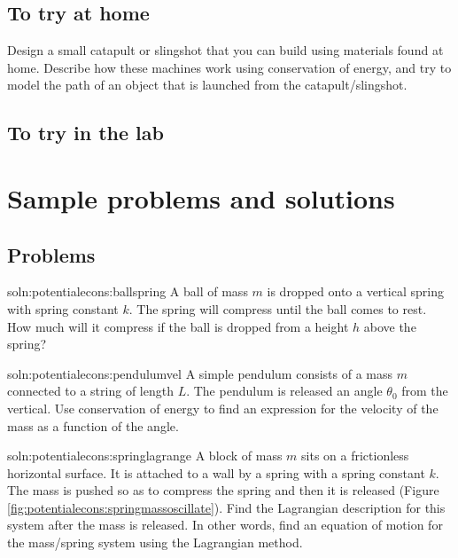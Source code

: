 \subsection{To try at home}
\begin{tQuestion}Design a small catapult or slingshot that you can build using materials found at home. Describe how these machines work using conservation of energy, and try to model the path of an object that is launched from the catapult/slingshot.\end{tQuestion}

\subsection{To try in the lab}

\newpage
\section{Sample problems and solutions}
\subsection{Problems}

\begin{problem}{soln:potentialecons:ballspring}{\label{prob:potentialecons:ballspring} A ball of mass $m$ is dropped onto a vertical spring with spring constant $k$. The spring will compress until the ball comes to rest. How much will it compress if the ball is dropped from a height $h$ above the spring?}
\end{problem}


\begin{problem}{soln:potentialecons:pendulumvel}{\label{prob:potentialecons:pendulumvel}
A simple pendulum consists of a mass $m$ connected to a string of length $L$. The pendulum is released an angle $\theta_0$ from the vertical. Use conservation of energy to find an expression for the velocity of the mass as a function of the angle.}
\end{problem}


\begin{problem}{soln:potentialecons:springlagrange}{ \label{prob:potentialecons:springlagrange} A block of mass $m$ sits on a frictionless horizontal surface. It is attached to a wall by a spring with a spring constant $k$. The mass is pushed so as to compress the spring and then it is released (Figure \ref{fig:potentialecons:springmassoscillate}). Find the Lagrangian description for this system after the mass is released. In other words, find an equation of motion for the mass/spring system using the Lagrangian method.}
\end{problem} 


